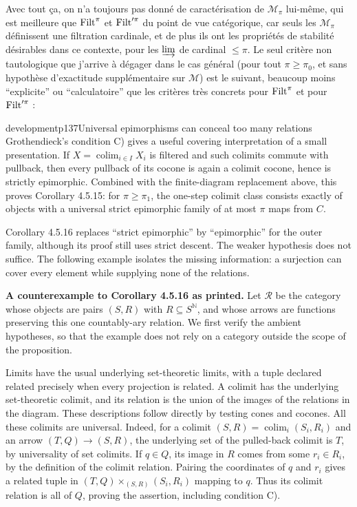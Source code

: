 Avec tout ça, on n'a toujours pas donné de caractérisation de $\mathcal{M}_{\pi}$ lui-même, qui est meilleure que $\operatorname{Filt}^{\pi}$ et $\operatorname{Filt}'^{\pi}$ du point de vue catégorique, car seuls les $\mathcal{M}_{\pi}$ définissent une filtration cardinale, et de plus ils ont les propriétés de stabilité désirables dans ce
contexte, pour les $\varinjlim$ de cardinal $\leqslant \pi$. Le seul critère non tautologique que j'arrive à dégager dans le cas général (pour tout $\pi \geqslant \pi_0$, et sans hypothèse d'exactitude supplémentaire sur $\mathcal{M}$) est le suivant, beaucoup moins ``explicite'' ou ``calculatoire'' que les critères très concrets pour $\operatorname{Filt}^{\pi}$ et pour $\operatorname{Filt}'^{\pi}$ :

\begin{dcomment}{development}{p137}{Universal epimorphisms can conceal too many relations}
Grothendieck's condition C) gives a useful covering interpretation of a small presentation. If $X=\operatorname{colim}_{i\in I}X_i$ is filtered and such colimits commute with pullback, then every pullback of its cocone is again a colimit cocone, hence is strictly epimorphic. Combined with the finite-diagram replacement above, this proves Corollary 4.5.15: for $\pi\geq\pi_1$, the one-step colimit class consists exactly of objects with a universal strict epimorphic family of at most $\pi$ maps from $C$.

Corollary 4.5.16 replaces ``strict epimorphic'' by ``epimorphic'' for the outer family, although its proof still uses strict descent. The weaker hypothesis does not suffice. The following example isolates the missing information: a surjection can cover every element while supplying none of the relations.

\textbf{A counterexample to Corollary 4.5.16 as printed.}\ours{}
Let $\mathcal R$ be the category whose objects are pairs $(S,R)$ with $R\subseteq S^{\mathbb N}$, and whose arrows are functions preserving this one countably-ary relation. We first verify the ambient hypotheses, so that the example does not rely on a category outside the scope of the proposition.

Limits have the usual underlying set-theoretic limits, with a tuple declared related precisely when every projection is related. A colimit has the underlying set-theoretic colimit, and its relation is the union of the images of the relations in the diagram. These descriptions follow directly by testing cones and cocones. All these colimits are universal. Indeed, for a colimit $(S,R)=\operatorname{colim}_i(S_i,R_i)$ and an arrow $(T,Q)\to(S,R)$, the underlying set of the pulled-back colimit is $T$, by universality of set colimits. If $q\in Q$, its image in $R$ comes from some $r_i\in R_i$, by the definition of the colimit relation. Pairing the coordinates of $q$ and $r_i$ gives a related tuple in $(T,Q)\times_{(S,R)}(S_i,R_i)$ mapping to $q$. Thus its colimit relation is all of $Q$, proving the assertion, including condition C).


\end{dcomment}

